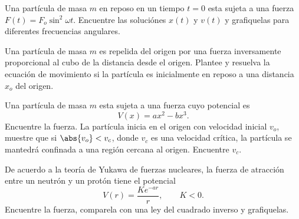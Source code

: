 \begin{mdframed}[style=warning]
	\begin{ejercicio}
		Una partícula de masa $m$ en reposo en un tiempo $t = 0$ esta sujeta a una fuerza $F(t) = F_o \sin ^2 {\omega t}$. Encuentre las soluciónes $x(t)$ y $v(t)$ y grafiquelas para diferentes frecuencias angulares.
	\end{ejercicio}
\end{mdframed}




\begin{mdframed}[style=warning]
	\begin{ejercicio}
		Una partícula de masa $m$ es repelida del origen por una fuerza inversamente proporcional al cubo de la distancia desde el origen. Plantee y resuelva la ecuación de movimiento si la partícula es inicialmente en reposo a una distancia $x_o$ del origen.
	\end{ejercicio}
\end{mdframed}




\begin{mdframed}[style=warning]
	\begin{ejercicio}
		Una partícula de masa $m$ esta sujeta a una fuerza cuyo potencial es
			$$V(x) = ax^2 - bx^3.$$
		Encuentre la fuerza. La partícula inicia en el origen con velocidad inicial $v_o$, muestre que si $\abs{v_o} < v_c$, donde $v_c$ es una velocidad crítica, la partícula se mantedrá confinada a una región cercana al origen. Encuentre $v_c$.
	\end{ejercicio}
\end{mdframed}




\begin{mdframed}[style=warning]
	\begin{ejercicio}
		De acuerdo a la teoría de Yukawa de fuerzas nucleares, la fuerza de atracción entre un neutrón y un protón tiene el potencial
			$$ V(r) = \frac{K e^{-ar}}{r}, \qquad K < 0. $$
		Encuentre la fuerza, comparela con una ley del cuadrado inverso y grafiquelas.
	\end{ejercicio}
\end{mdframed}




